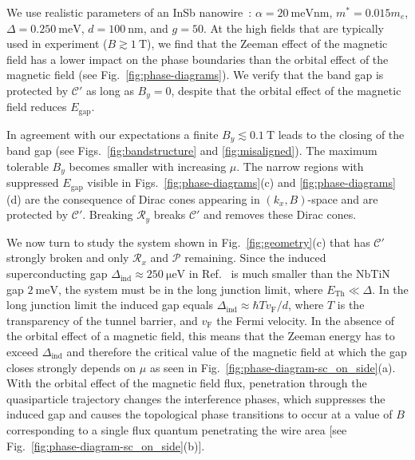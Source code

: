 We use realistic parameters of an InSb nanowire~\cite{Mourik2012}: $\alpha=\SI{20}{\milli\electronvolt \nano\metre}$, $m^{*}=0.015m_e$, $\Delta=\SI{0.250}{\milli\electronvolt}$, $d=\SI{100}{\nano\metre}$, and $g=50$.
At the high fields that are typically used in experiment ($B \gtrsim \SI{1}{\tesla}$), we find that the Zeeman effect of the magnetic field has a lower impact on the phase boundaries than the orbital effect of the magnetic field (see Fig.~\ref{fig:phase-diagrams}).
We verify that the band gap is protected by $\mathcal{C}'$ as long as $B_y = 0$, despite that the orbital effect of the magnetic field reduces $E_\textrm{gap}$.

In agreement with our expectations a finite $B_y \lesssim \SI{0.1}{\tesla}$ leads to the closing of the band gap (see Figs.~\ref{fig:bandstructure} and \ref{fig:misaligned}).
The maximum tolerable $B_y $ becomes smaller with increasing $\mu$.
The narrow regions with suppressed $E_\textrm{gap}$ visible in Figs.~\ref{fig:phase-diagrams}(c) and \ref{fig:phase-diagrams}(d) are the consequence of Dirac cones appearing in $(k_{x}, B)$-space and are protected by $\mathcal{C}'$.
Breaking $\mathcal{R}_y$ breaks $\mathcal{C}'$ and removes these Dirac cones.


We now turn to study the system shown in Fig.~\ref{fig:geometry}(c) that has $\mathcal{C}'$ strongly broken and only $\mathcal{R}_x$ and $\mathcal{P}$ remaining.
Since the induced superconducting gap $\Delta_\textrm{ind}\approx \SI{250}{\micro\electronvolt}$ in Ref.~\cite{Mourik2012} is much smaller than the $\mathrm{NbTiN}$ gap $\SI{2}{\milli\electronvolt}$, the system must be in the long junction limit, where $E_\textrm{Th} \ll \Delta$.
In the long junction limit the induced gap equals $\Delta_\textrm{ind}\approx\hbar T v_\textrm{F} / d$, where $T$ is the transparency of the tunnel barrier, and $v_\textrm{F}$ the Fermi velocity.
In the absence of the orbital effect of a magnetic field, this means that the Zeeman energy has to exceed $\Delta_\textrm{ind}$ and therefore the critical value of the magnetic field at which the gap closes strongly depends on $\mu$ as seen in Fig.~\ref{fig:phase-diagram-sc_on_side}(a).
With the orbital effect of the magnetic field flux, penetration through the quasiparticle trajectory changes the interference phases, which suppresses the induced gap and causes the topological phase transitions to occur at a value of $B$ corresponding to a single flux quantum penetrating the wire area [see Fig.~\ref{fig:phase-diagram-sc_on_side}(b)].

